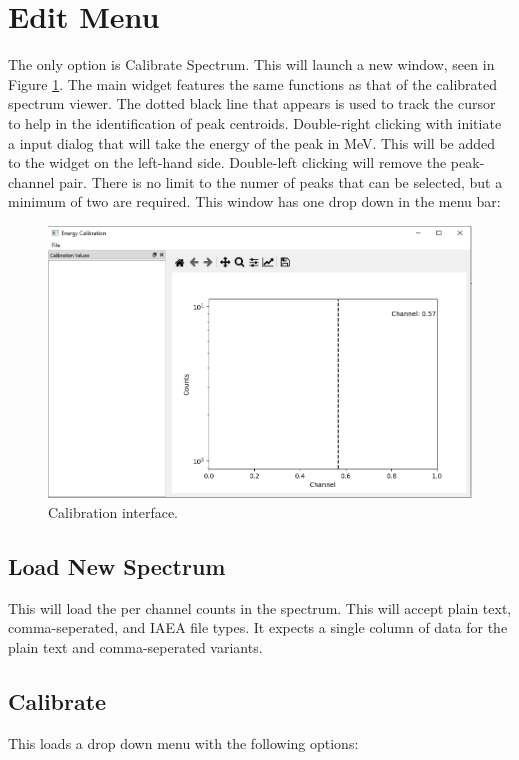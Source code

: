 \section{Edit Menu}
The only option is Calibrate Spectrum. This will launch a new window, seen in Figure \ref{fig:calibrate_window}. The main widget features the same functions as that of the calibrated spectrum viewer. The dotted black line that appears is used to track the cursor to help in the identification of peak centroids. Double-right clicking with initiate a input dialog that will take the energy of the peak in MeV. This will be added to the widget on the left-hand side. Double-left clicking will remove the peak-channel pair. There is no limit to the numer of peaks that can be selected, but a minimum of two are required. This window has one drop down in the menu bar: 
\begin{figure}[h!]
	\centering
	\includegraphics[width=\linewidth]{Calibrate.png}
	\caption{Calibration interface.}
	\label{fig:calibrate_window}
\end{figure}


	\subsection{Load New Spectrum}
		This will load the per channel counts in the spectrum. This will accept plain text, comma-seperated, and IAEA file types. It expects a single column of data for the plain text and comma-seperated variants.

	\subsection{Calibrate}
		This loads a drop down menu with the following options:
